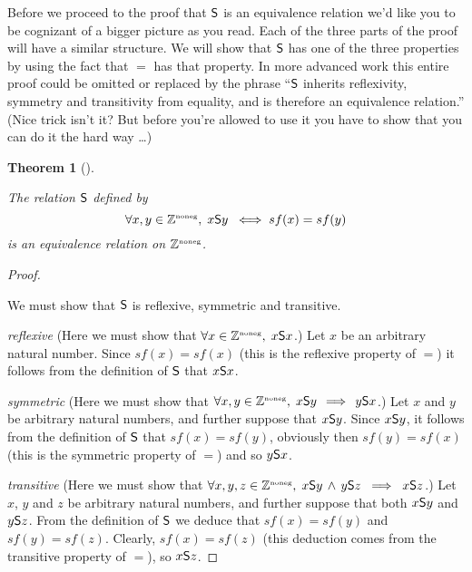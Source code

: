\documentclass[10pt,]{book}
\theoremstyle{plain}
\newtheorem{theorem}{Theorem}[section]
\theoremstyle{definition}
\theoremstyle{definition}
\numberwithin{equation}{section}
\renewcommand{\Naturals}{{\mathbb Z}^{\mbox{\tiny noneg}} }
\newcommand{\Naturals}{{\mathbb N}}
\newcommand{\relS}{\mbox{\textsf S}}
\begin{document}
    Before we proceed to the proof that \(\relS\) is an equivalence relation we'd like
    you to be cognizant of a bigger picture as you read. Each of the three parts of
    the proof will have a similar structure. We will show that \(\relS\) has one of the
    three properties by using the fact that \(=\) has that property. In more advanced
    work this entire proof could be omitted or replaced by the phrase ``\(\relS\) inherits
    reflexivity, symmetry and transitivity from equality, and is therefore an equivalence
    relation.'' (Nice trick isn't it? But before you're allowed to use it you have
    to show that you can do it the hard way \dots{})
\begin{theorem}[{}]\label{theorem-27}

        The relation \(\relS\) defined by
        \begin{equation*}
          \forall x, y \in \Naturals, \; x \relS y \; \iff sf(x) = sf(y)
        \end{equation*}
        is an equivalence relation on \(\Naturals\).
\end{theorem}
\begin{proof}\hypertarget{proof-38}{}

      We must show that \(\relS\) is reflexive, symmetric and transitive.
\par

      \emph{reflexive} \textemdash{} (Here we must show that \(\forall x \in \Naturals, \; x \relS x\).)
      Let \(x\) be an arbitrary natural number. Since \(sf(x) = sf(x)\) (this is the reflexive
      property of \(=\)) it follows from the definition of \(\relS\) that \(x \relS x\).
\par

      \emph{symmetric} \textemdash{} (Here we must show that \(\forall x,y \in \Naturals, \; x \relS y \, 
      \implies \, y \relS x\).)
      Let \(x\) and \(y\) be arbitrary natural numbers, and further suppose that \(x \relS y\).
      Since \(x \relS y\), it follows from the definition of \(\relS\) that \(sf(x) = sf(y)\),
      obviously then \(sf(y) = sf(x)\) (this is the symmetric property of \(=\)) and so
      \(y \relS x\).
\par

      \emph{transitive} \textemdash{} (Here we must show that \(\forall x,y,z \in \Naturals, \; x \relS y \,
      \land \, y \relS z \; \implies \; x \relS z\).)
      Let \(x\), \(y\) and \(z\) be arbitrary natural numbers, and further suppose that both
      \(x \relS y\) and \(y \relS z\). From the definition of \(\relS\) we deduce that
      \(sf(x) = sf(y)\) and \(sf(y) = sf(z)\). Clearly, \(sf(x) = sf(z)\) (this deduction comes
      from the transitive property of \(=\)), so \(x \relS z\).
\end{proof}
\par
\end{document}
